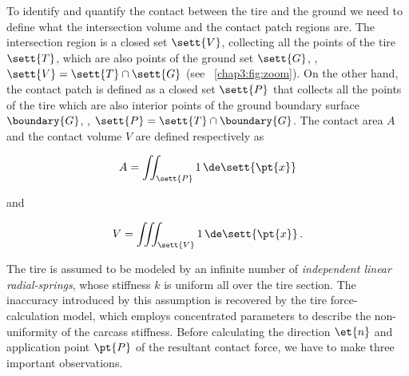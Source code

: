 To identify and quantify the contact between the tire and the ground we need to define what the intersection volume and the contact patch regions are. The intersection region is a closed set $\sett{V}$, collecting all the points of the tire $\sett{T}$, which are also points of the ground set $\sett{G}$, \ie{}, $\sett{V} = \sett{T} \cap \sett{G}$ (see \figurename{}~\ref{chap3:fig:zoom}). On the other hand, the contact patch is defined as a closed set $\sett{P}$ that collects all the points of the tire which are also interior points of the ground boundary surface $\boundary{G}$, \ie{}, $\sett{P} = \sett{T} \cap \boundary{G}$. The contact area $A$ and the contact volume $V$ are defined respectively as
%
\begin{center}
  \begin{minipage}[b]{0.425\columnwidth}
      \vspace{-\baselineskip}
      \begin{equation}
        A = \iint_\sett{P} 1 \, \de\sett{\pt{x}}
        \label{chap3:eq:int_area}
      \end{equation}
    \end{minipage}%
    \hfill\hfill and \hfill
    \begin{minipage}[b]{0.425\columnwidth}
      \vspace{-\baselineskip}
      \begin{equation}
        V = \iiint_\sett{V} 1 \, \de\sett{\pt{x}}
        \,\text{.}
        \label{chap3:eq:int_volume}
      \end{equation}
  \end{minipage}
\end{center}

The tire is assumed to be modeled by an infinite number of \emph{independent linear radial-springs}, whose stiffness $k$ is uniform all over the tire section. The inaccuracy introduced by this assumption is recovered by the tire force-calculation model, which employs concentrated parameters to describe the non-uniformity of the carcass stiffness. Before calculating the direction $\et{n}$ and application point $\pt{P}$ of the resultant contact force, we have to make three important observations.

